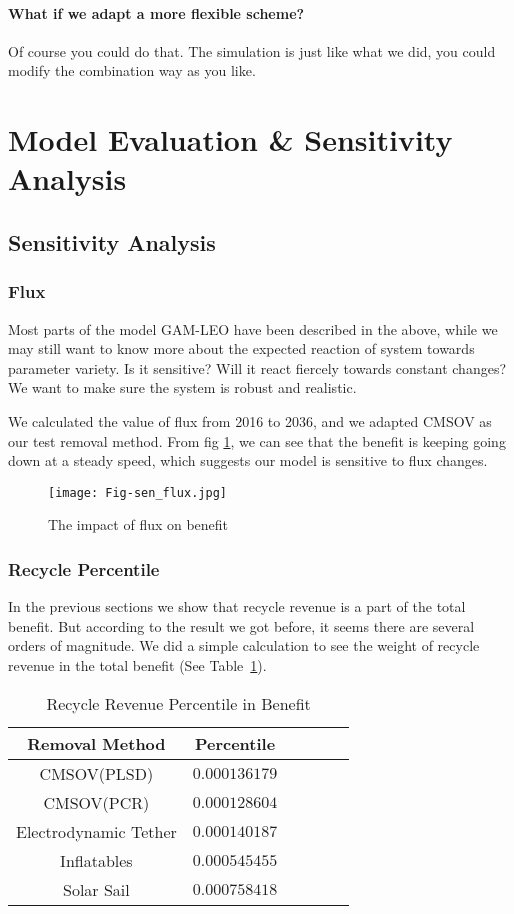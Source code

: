 \documentclass{mcmthesis}
\begin{document}
	\paragraph{What if we adapt a more flexible scheme?}
	Of course you could do that. The simulation is just like what we did, you could modify the combination way as you like.
	
\section{Model Evaluation \& Sensitivity Analysis} \label{Sec-Sensitivity}
	
\subsection{Sensitivity Analysis}
	
\subsubsection{Flux}
	Most parts of the model GAM-LEO have been described in the above, while we may still want to know more about the expected reaction of system towards parameter variety. Is it sensitive? Will it react fiercely towards constant changes? We want to make sure the system is robust and realistic.
	
	We calculated the value of flux from 2016 to 2036, and we adapted CMSOV as our test removal method. From fig \ref{Fig-SenFlux}, we can see that the benefit is keeping going down at a steady speed, which suggests our model is sensitive to flux changes.
	\begin{figure}[htbp]
		\centering
		\texttt{[image: Fig-sen\_flux.jpg]}
		\caption{The impact of flux on benefit}
		\label{Fig-SenFlux}
	\end{figure}
	
	\subsubsection{Recycle Percentile}
	In the previous sections we show that recycle revenue is a part of the total benefit. But according to the result we got before, it seems there are several orders of magnitude. We did a simple calculation to see the weight of recycle revenue in the total benefit (See Table~\ref{Tab-Recycle}).
	
	\begin{table}[htbp]
		\centering
		\caption{Recycle Revenue Percentile in Benefit}
		\begin{tabular}{cccccc}
			\hline
			Removal Method &  Percentile  \\
			\hline
			\hline
			CMSOV(PLSD) 		        & $0.000136179$\\
			CMSOV(PCR) 		        & $0.000128604$\\
			Electrodynamic Tether & $0.000140187$ \\
			Inflatables 	        & $0.000545455$  \\
			Solar Sail 	                & $0.000758418$  \\
			\hline
		\end{tabular}
		\label{Tab-Recycle}
	\end{table}
	
\end{document}
